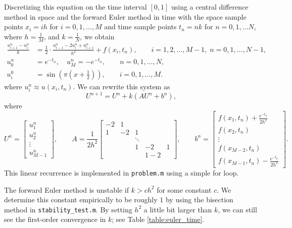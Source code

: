 \documentclass{homework}
\begin{document}
	\begin{alphaparts}
		\questionpart
		Discretizing this equation on the time interval $[0,1]$ using a central difference method in space and the forward Euler method in time with the space sample points $x_i = ih$ for $i =0,1,\dots, M$ and time sample points $t_n = nk$ for $n=0,1,\dots N$, where $h = \frac{1}{M}$, and $k = \frac{1}{N}$, we obtain
		\begin{align*}
			\frac{u^n_{i+1} - u^n_i}{k} &= \frac{1}{2}\cdot\frac{u^n_{i-1}-2u^n_i + u^n_{i+1}}{h^2} + f(x_i,t_n), \qquad i =1,2,\dots, M-1, \; n = 0,1,\dots, N-1,\\
			u^n_0 &= e^{-t_n}, \quad u^n_{M} = -e^{-t_n}, \qquad n = 0,1,\dots, N,\\
			u^0_i &= \sin\left(\pi\left(x+\frac{1}{2}\right)\right), \qquad i = 0,1,\dots, M.
		\end{align*}
		where $u^n_i \approx u(x_i, t_n)$. We can rewrite this system as
		\begin{equation*}
			U^{n+1} = U^n + k(AU^n + b^n),
		\end{equation*}
		where
		\begin{equation*}
			U^n = \left[\begin{matrix}u^n_1 \\ u^n_2 \\ \vdots \\ u^n_{M-1}\end{matrix}\right], \qquad A = \frac{1}{2h^2}\left[\begin{matrix}
				-2 & 1 \\
				1 & -2 & 1 \\ 
				& & \ddots \\
				& & 1 & -2 & 1 \\
				& & & 1 - 2
			\end{matrix}\right], \qquad
			b^n = \left[\begin{matrix}
				f(x_1,t_n) + \frac{e^{-t_n}}{2h^2} \\
				f(x_2,t_n) \\
				\vdots
				\\
				f(x_{M-2}, t_n) \\
				f(x_{M-1}, t_n) - \frac{e^{-t_n}}{2h^2}
			\end{matrix}\right].
		\end{equation*}
		This linear recurrence is implemented in \verb*|problem.m| using a simple for loop.
		
		\questionpart The forward Euler method is unstable if $k > ch^2$ for some constant $c$. We determine this constant empirically to be roughly $1$ by using the bisection method in \verb*|stability_test.m|. By setting $h^2$ a little bit larger than $k$, we can still see the first-order convergence in $k$; see Table \ref{table:euler_time}.
		

\end{alphaparts}
\end{document}

